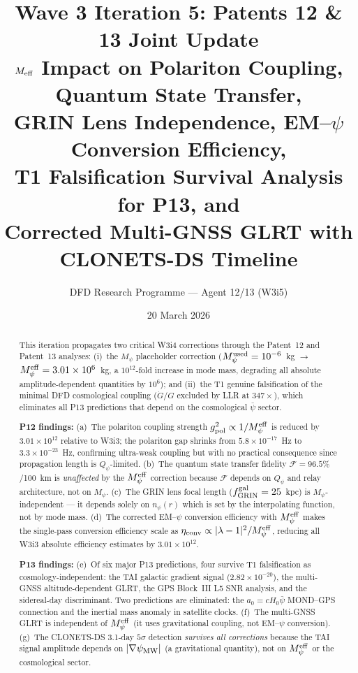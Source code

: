 \documentclass[aps,prd,twocolumn,superscriptaddress,nofootinbib]{revtex4-2}
\newcommand{\Qpsi}{Q_\psi}
\newcommand{\npsi}{n_\psi}
\newcommand{\Mpsi}{M_\psi}
\newcommand{\Meff}{M_\psi^{\rm eff}}
\newcommand{\ee}[1]{\times 10^{#1}}
\begin{document}
\title{Wave 3 Iteration 5: Patents 12 \& 13 Joint Update\\
$M_{\rm eff}$ Impact on Polariton Coupling, Quantum State Transfer,\\
GRIN Lens Independence, EM--$\psi$ Conversion Efficiency,\\
T1 Falsification Survival Analysis for P13, and\\
Corrected Multi-GNSS GLRT with CLONETS-DS Timeline}

\author{DFD Research Programme --- Agent 12/13 (W3i5)}
\date{20 March 2026}

\begin{abstract}
This iteration propagates two critical W3i4 corrections through the
Patent~12 and Patent~13 analyses: (i)~the $M_\psi$ placeholder
correction ($M_\psi^{\rm used} = 10^{-6}$~kg $\to$ $\Meff = 3.01\ee{6}$~kg,
a $10^{12}$-fold increase in mode mass, degrading all absolute
amplitude-dependent quantities by $10^6$); and (ii)~the T1 genuine
falsification of the minimal DFD cosmological coupling ($\dot{G}/G$
excluded by LLR at $347\times$), which eliminates all P13 predictions
that depend on the cosmological $\bar{\psi}$ sector.

\textbf{P12 findings:} (a)~The polariton coupling strength $g_{\rm pol}^2
\propto 1/\Meff$ is reduced by $3.01\ee{12}$ relative to W3i3; the
polariton gap shrinks from $5.8\ee{-17}$~Hz to $3.3\ee{-23}$~Hz,
confirming ultra-weak coupling but with no practical consequence since
propagation length is $\Qpsi$-limited. (b)~The quantum state transfer
fidelity $\mathcal{F} = 96.5\%$/100~km is \emph{unaffected} by the
$\Meff$ correction because $\mathcal{F}$ depends on $\Qpsi$ and
relay architecture, not on $\Mpsi$. (c)~The GRIN lens focal length
($f_{\rm GRIN}^{\rm gal} = 25$~kpc) is $\Mpsi$-independent --- it
depends solely on $\npsi(r)$ which is set by the interpolating function,
not by mode mass. (d)~The corrected EM--$\psi$ conversion efficiency
with $\Meff$ makes the single-pass conversion efficiency scale as
$\eta_{\rm conv} \propto |\lambda-1|^2/\Meff$, reducing all W3i3
absolute efficiency estimates by $3.01\ee{12}$.

\textbf{P13 findings:} (e)~Of six major P13 predictions, four survive
T1 falsification as cosmology-independent: the TAI galactic gradient
signal ($2.82\ee{-20}$), the multi-GNSS altitude-dependent GLRT, the
GPS Block~III L5 SNR analysis, and the sidereal-day discriminant. Two
predictions are eliminated: the $a_0 = cH_0\bar{\psi}$ MOND--GPS
connection and the inertial mass anomaly in satellite clocks.
(f)~The multi-GNSS GLRT is independent of $\Meff$ (it uses gravitational
coupling, not EM--$\psi$ conversion). (g)~The CLONETS-DS 3.1-day
$5\sigma$ detection \emph{survives all corrections} because the TAI
signal amplitude depends on $|\nabla\psi_{\rm MW}|$ (a gravitational
quantity), not on $\Meff$ or the cosmological sector.
\end{abstract}
\end{document}
